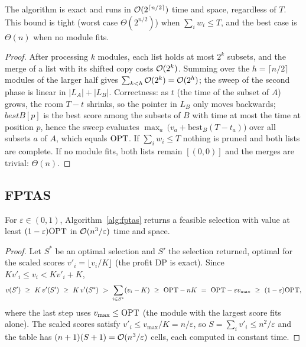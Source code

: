 \begin{theorem}\label{thm:mitm}
The algorithm is exact and runs in $\mathcal{O}(2^{\lceil n/2\rceil})$ time and space, regardless of $T$. This bound is tight (worst case $\Theta(2^{n/2})$) when $\sum_i w_i\le T$, and the best case is $\Theta(n)$ when no module fits.
\end{theorem}
\begin{proof}
After processing $k$ modules, each list holds at most $2^k$ subsets, and the merge of a list with its shifted copy costs $\mathcal{O}(2^k)$. Summing over the $h=\lceil n/2\rceil$ modules of the larger half gives $\sum_{k<h}\mathcal{O}(2^k)=\mathcal{O}(2^h)$; the sweep of the second phase is linear in $|L_A|+|L_B|$. Correctness: as $t$ (the time of the subset of $A$) grows, the room $T-t$ shrinks, so the pointer in $L_B$ only moves backwards; $bestB[p]$ is the best score among the subsets of $B$ with time at most the time at position $p$, hence the sweep evaluates $\max_{a}\,\bigl(v_a+\mathrm{best}_B(T-t_a)\bigr)$ over all subsets $a$ of $A$, which equals $\mathrm{OPT}$. If $\sum_iw_i\le T$ nothing is pruned and both lists are complete. If no module fits, both lists remain $[(0,0)]$ and the merges are trivial: $\Theta(n)$.
\end{proof}

\subsection{FPTAS}

\begin{theorem}\label{thm:fptas}
For $\varepsilon\in(0,1)$, Algorithm~\ref{alg:fptas} returns a feasible selection with value at least $(1-\varepsilon)\mathrm{OPT}$ in $\mathcal{O}(n^3/\varepsilon)$ time and space.
\end{theorem}
\begin{proof}
Let $S^*$ be an optimal selection and $S'$ the selection returned, optimal for the scaled scores $v'_i=\lfloor v_i/K\rfloor$ (the profit DP is exact). Since $K v'_i\le v_i<Kv'_i+K$,
\[
v(S')\ \ge\ K\,v'(S')\ \ge\ K\,v'(S^*)\ >\ \sum_{i\in S^*}(v_i-K)\ \ge\ \OPT-nK\ =\ \OPT-\varepsilon v_{\max}\ \ge\ (1-\varepsilon)\OPT,
\]
where the last step uses $v_{\max}\le\mathrm{OPT}$ (the module with the largest score fits alone). The scaled scores satisfy $v'_i\le v_{\max}/K=n/\varepsilon$, so $S=\sum_iv'_i\le n^2/\varepsilon$ and the table has $(n+1)(S+1)=\mathcal{O}(n^3/\varepsilon)$ cells, each computed in constant time.
\end{proof}

